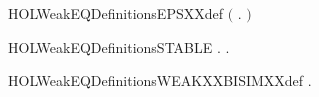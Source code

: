 \newcommand{\HOLWeakEQDate}{04 Settembre 2019}
\newcommand{\HOLWeakEQTime}{15:57}
\begin{SaveVerbatim}{HOLWeakEQDefinitionsEPSXXdef}
\HOLTokenTurnstile{}  \HOLSymConst{\ensuremath{=}} \ensuremath{(}\HOLTokenLambda{} .  \HOLTokenTransBegin\HOLConst{\ensuremath{\tau}}\HOLTokenTransEnd {}\ensuremath{)}\HOLSymConst{\HOLTokenSupStar{}}
\end{SaveVerbatim}
\newcommand{\HOLWeakEQDefinitionsEPSXXdef}{\UseVerbatim{HOLWeakEQDefinitionsEPSXXdef}}
\begin{SaveVerbatim}{HOLWeakEQDefinitionsSTABLE}
\HOLTokenTurnstile{} \HOLSymConst{\HOLTokenForall{}}.   \HOLSymConst{\HOLTokenEquiv{}} \HOLSymConst{\HOLTokenForall{}} .  \HOLTokenTransBegin{}\HOLTokenTransEnd {} \HOLSymConst{\HOLTokenImp{}}  \HOLSymConst{\HOLTokenNotEqual{}} \HOLConst{\ensuremath{\tau}}
\end{SaveVerbatim}
\newcommand{\HOLWeakEQDefinitionsSTABLE}{\UseVerbatim{HOLWeakEQDefinitionsSTABLE}}
\begin{SaveVerbatim}{HOLWeakEQDefinitionsWEAKXXBISIMXXdef}
\HOLTokenTurnstile{} \HOLSymConst{\HOLTokenForall{}}.   \HOLSymConst{\HOLTokenEquiv{}}   \HOLConst{\ensuremath{\tau}} 
\end{SaveVerbatim}
\newcommand{\HOLWeakEQDefinitionsWEAKXXBISIMXXdef}{\UseVerbatim{HOLWeakEQDefinitionsWEAKXXBISIMXXdef}}
